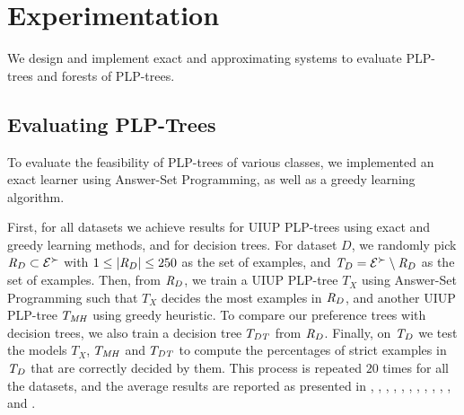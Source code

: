 \section{Experimentation}
We design and implement exact and approximating systems to evaluate PLP-trees and forests of
PLP-trees.

\subsection{Evaluating PLP-Trees}
To evaluate the feasibility of PLP-trees of various classes,
we implemented an exact learner using Answer-Set Programming,
as well as a greedy learning algorithm.

First, for all datasets we achieve results for UIUP PLP-trees
using exact and greedy learning methods, and for decision trees.
For dataset $D$, we randomly pick $\mathit{R}_D \subset \mathcal{E}^\succ$ with $1 \leq |\mathit{R}_D| \leq 250$
as the set of  examples,
and $\mathit{T}_D = \mathcal{E}^\succ \setminus \mathit{R}_D$ as the set of  examples.
Then, from $\mathit{R}_D$, we train a UIUP PLP-tree $T_X$ using Answer-Set Programming 
such that $T_X$ decides the most examples in $\mathit{R}_D$, and another UIUP PLP-tree $T_{\mathit{MH}}$ using
greedy heuristic.
To compare our preference trees with decision trees, we also train a decision tree $T_{\mathit{DT}}$
from $\mathit{R}_D$.
Finally, on $\mathit{T}_D$ we test the models $T_X$, $T_{\mathit{MH}}$ and $T_{\mathit{DT}}$ to compute the percentages of 
strict examples in $\mathit{T}_D$ that are correctly decided by them.
This process is repeated $20$ times for all the datasets, and the average results are reported
as  presented in , , , 
, , , , , , 
, , and .

